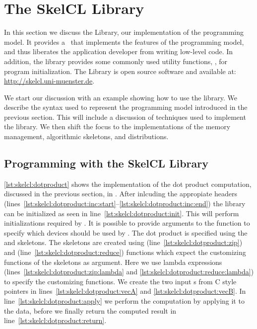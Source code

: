 \section{The SkelCL Library}
\label{section:skelcl-library}
In this section we discuss the \SkelCL Library, our implementation of the \SkelCL programming model.
It provides a \Cpp~\API that implements the features of the \SkelCL programming model, and thus liberates the application developer from writing low-level code.
In addition, the library provides some commonly used utility functions, \eg, for program initialization.
The \SkelCL Library is open source software and available at: \url{http://skelcl.uni-muenster.de}.

We start our discussion with an example showing how to use the \SkelCL library.
We describe the syntax used to represent the \SkelCL programming model introduced in the previous section.
This will include a discussion of \Cpp techniques used to implement the library.
We then shift the focus to the implementations of the memory management, algorithmic skeletons, and distributions.

\subsection{Programming with the SkelCL Library}

\autoref{lst:skelcl:dotproduct} shows the implementation of the dot product computation, discussed in the previous section, in \SkelCL.
After inlcuding the appropiate \SkelCL headers (lines~\autoref{lst:skelcl:dotproduct:inc:start}--\autoref{lst:skelcl:dotproduct:inc:end}) the \SkelCL library can be initialized as seen in line~\autoref{lst:skelcl:dotproduct:init}.
This will perform initializations required by \OpenCL.
It is possible to provide arguments to the  function to specify which \OpenCL devices should be used by \SkelCL.
The dot product is specified using the \zip and \reduce skeletons.
The skeletons are created using  (line~\autoref{lst:skelcl:dotproduct:zip}) and  (line~\autoref{lst:skelcl:dotproduct:reduce}) functions which expect the customizing functions of the skeletons as argument.
Here we use \Cpp lambda expressions (lines~\autoref{lst:skelcl:dotproduct:zip:lambda} and \autoref{lst:skelcl:dotproduct:reduce:lambda}) to specify the customizing functions.
We create the two input s from C style pointers in lines~\autoref{lst:skelcl:dotproduct:vecA} and \autoref{lst:skelcl:dotproduct:vecB}.
In line~\autoref{lst:skelcl:dotproduct:apply} we perform the computation by applying it to the data, before we finally return the computed result in line~\autoref{lst:skelcl:dotproduct:return}.


